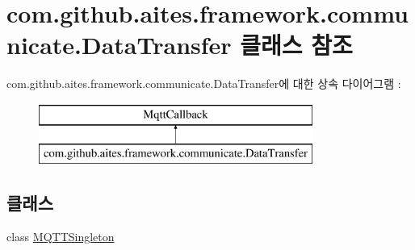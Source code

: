 \hypertarget{classcom_1_1github_1_1aites_1_1framework_1_1communicate_1_1_data_transfer}{}\section{com.\+github.\+aites.\+framework.\+communicate.\+Data\+Transfer 클래스 참조}
\label{classcom_1_1github_1_1aites_1_1framework_1_1communicate_1_1_data_transfer}
com.\+github.\+aites.\+framework.\+communicate.\+Data\+Transfer에 대한 상속 다이어그램 \+: \begin{figure}[H]
\begin{center}
\leavevmode
\includegraphics[height=2.000000cm]{classcom_1_1github_1_1aites_1_1framework_1_1communicate_1_1_data_transfer}
\end{center}
\end{figure}
\subsection*{클래스}
\begin{DoxyCompactItemize}
\item 
class \mbox{\hyperlink{classcom_1_1github_1_1aites_1_1framework_1_1communicate_1_1_data_transfer_1_1_m_q_t_t_singleton}{M\+Q\+T\+T\+Singleton}}
\end{DoxyCompactItemize}
